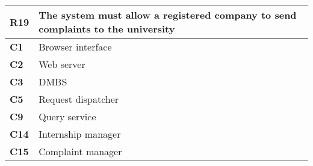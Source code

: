 \begin{table}[H]
    \centering
    \begin{tabular}{|l|m{10cm}|}
        \hline \textbf{R19} & The system must allow a registered company to send complaints to the university \\
        \hline \textbf{C1} & Browser interface \\
        \hline \textbf{C2} & Web server \\
        \hline \textbf{C3} & DMBS \\
        \hline \textbf{C5} & Request dispatcher \\
        \hline \textbf{C9} & Query service \\
        \hline \textbf{C14} & Internship manager \\
        \hline \textbf{C15} & Complaint manager \\
        \hline
    \end{tabular}
\end{table}

